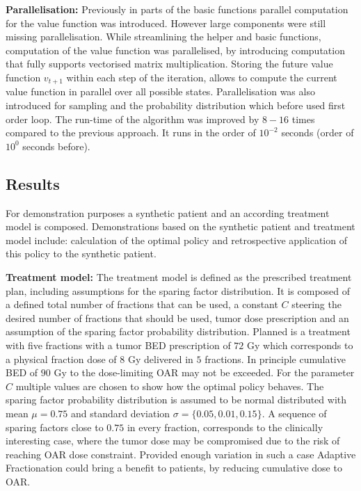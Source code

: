 \documentclass[\relativeRoot/ada.tex]{subfiles}
\begin{document}
\textbf{Parallelisation:} Previously in parts of the basic functions parallel computation for the value function was introduced. However large components were still missing parallelisation. While streamlining the helper and basic functions, computation of the value function was parallelised, by introducing computation that fully supports vectorised matrix multiplication. Storing the future value function $v_{t+1}$ within each step of the iteration, allows to compute the current value function in parallel over all possible states. Parallelisation was also introduced for sampling and the probability distribution which before used first order loop. The run-time of the algorithm was improved by $8-16$ times compared to the previous approach. It runs in the order of $10^{-2}$ seconds (order of $10^{0}$ seconds before).

\subsection{Results}

For demonstration purposes a synthetic patient and an according treatment model is composed. Demonstrations based on the synthetic patient and treatment model include: calculation of the optimal policy and retrospective application of this policy to the synthetic patient.

\textbf{Treatment model:} The treatment model is defined as the prescribed treatment plan, including assumptions for the sparing factor distribution. It is composed of a defined total number of fractions that can be used, a constant $C$ steering the desired number of fractions that should be used, tumor dose prescription and an assumption of the sparing factor probability distribution. Planned is a treatment with five fractions with a tumor BED prescription of $72$ Gy which corresponds to a physical fraction dose of $8$ Gy delivered in $5$ fractions. In principle cumulative BED of $90$ Gy to the dose-limiting OAR may not be exceeded. For the parameter $C$ multiple values are chosen to show how the optimal policy behaves. The sparing factor probability distribution is assumed to be normal distributed with mean $\mu=0.75$ and standard deviation $\sigma = \{ 0.05, 0.01, 0.15\}$. A sequence of sparing factors close to $0.75$ in every fraction, corresponds to the clinically interesting case, where the tumor dose may be compromised due to the risk of reaching OAR dose constraint. Provided enough variation in such a case Adaptive Fractionation could bring a benefit to patients, by reducing cumulative dose to OAR.\\
\end{document}
